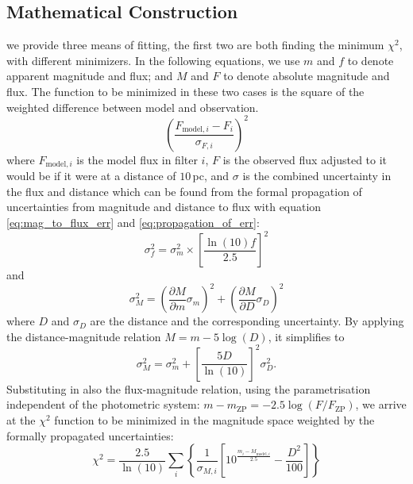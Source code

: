 \documentclass[fleqn,usenatbib]{rasti}
\begin{document}
\subsection{Mathematical Construction}
we provide three means of fitting, the first two are both finding the minimum
$\chi^2$, with different minimizers. In the following equations, we use $m$ and
$f$ to denote apparent magnitude and flux; and $M$ and $F$ to denote absolute
magnitude and flux. The function to be minimized in these two cases is the
square of the weighted difference between model and observation.
\begin{equation}
    \label{eq:lsq}
    \left(\dfrac{F_{\mathrm{model}, i} - F_{i}}{\sigma_{F, i}}\right)^{2}
\end{equation}
where $F_{\mathrm{model}, i}$ is the model flux in filter $i$, $F$ is
the observed flux adjusted to it would be if it were at a distance of
$10\,$pc, and $\sigma$ is the combined uncertainty in the flux and distance
which can be found from the formal propagation of uncertainties from
magnitude and distance to flux with equation \ref{eq:mag_to_flux_err} and
\ref{eq:propagation_of_err}:
\begin{equation}
    \label{eq:mag_to_flux_err}
    \sigma_{f}^{2} = \sigma_{m}^{2} \times \left[ \dfrac{\ln(10) f}{2.5} \right]^{2}
\end{equation}
and
\begin{equation}
    \label{eq:propagation_of_err}
    \sigma_{M}^{2} = \left( \dfrac{\partial M}{\partial m} \sigma_{m} \right)^2 + \left( \dfrac{\partial M}{\partial D} \sigma_{D} \right)^2
\end{equation}
where $D$ and $\sigma_D$ are the distance and the corresponding uncertainty. By
applying the distance-magnitude relation $M = m - 5\log(D)$, it simplifies to
\begin{equation}
    \label{eq:mag_err}
    \sigma_{M}^2 = \sigma^2_{m} + \left[ \dfrac{5 D}{\ln(10)} \right]^2 \sigma_{D}^2.
\end{equation}
Substituting in also the flux-magnitude relation, using the parametrisation
independent of the photometric system: $m - m_{\mathrm{ZP}}=-2.5\log(F/F_{\mathrm{ZP}})$,
we arrive at the $\chi^2$ function to be minimized in the magnitude space weighted
by the formally propagated uncertainties:
\begin{equation}
    \label{eq:chi2}
    \chi^{2} = \dfrac{2.5}{\ln(10)} \sum_{i}\left\{ \dfrac{1}{\sigma_{M, i}} \left[ 10^{\frac{m_{i} - M_{\mathrm{model}, i}}{2.5}} - \dfrac{D^{2}}{100} \right] \right\}
\end{equation}
\end{document}
